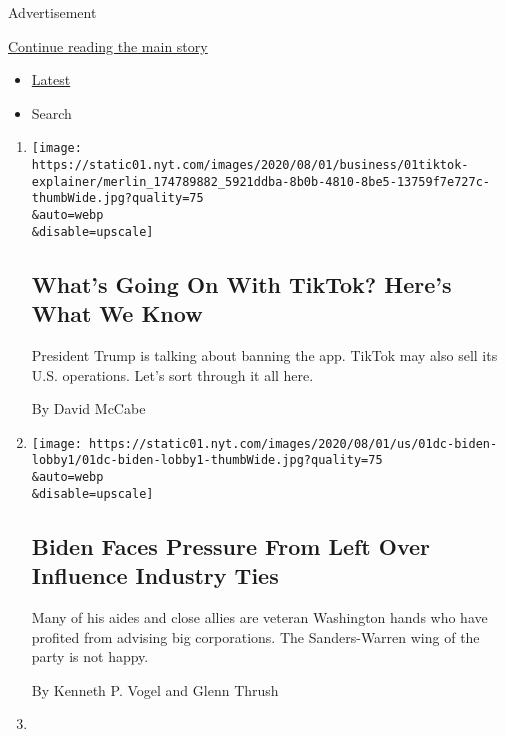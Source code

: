 Advertisement

\protect\hyperlink{after-mid1}{Continue reading the main story}

\begin{itemize}
\tightlist
\item
  \protect\hyperlink{stream-panel}{Latest}
\item
  Search
\end{itemize}

\begin{enumerate}
\def\labelenumi{\arabic{enumi}.}
\item
  \href{/2020/08/01/technology/tiktok-trump-microsoft-bytedance-china-ban.html}{}

  \texttt{[image: https://static01.nyt.com/images/2020/08/01/business/01tiktok-explainer/merlin\_174789882\_5921ddba-8b0b-4810-8be5-13759f7e727c-thumbWide.jpg?quality=75\\\&auto=webp\\\&disable=upscale]}

  \hypertarget{whats-going-on-with-tiktok-heres-what-we-know}{%
  \subsection{What's Going On With TikTok? Here's What We
  Know}\label{whats-going-on-with-tiktok-heres-what-we-know}}

  President Trump is talking about banning the app. TikTok may also sell
  its U.S. operations. Let's sort through it all here.

  By David McCabe
\item
  \href{/2020/08/01/us/politics/biden-lobbyist-ties.html}{}

  \texttt{[image: https://static01.nyt.com/images/2020/08/01/us/01dc-biden-lobby1/01dc-biden-lobby1-thumbWide.jpg?quality=75\\\&auto=webp\\\&disable=upscale]}

  \hypertarget{biden-faces-pressure-from-left-over-influence-industry-ties}{%
  \subsection{Biden Faces Pressure From Left Over Influence Industry
  Ties}\label{biden-faces-pressure-from-left-over-influence-industry-ties}}

  Many of his aides and close allies are veteran Washington hands who
  have profited from advising big corporations. The Sanders-Warren wing
  of the party is not happy.

  By Kenneth P. Vogel and Glenn Thrush
\item
  \href{/2020/08/01/us/eid-al-adha-coronavirus.html}{}


\end{enumerate}
